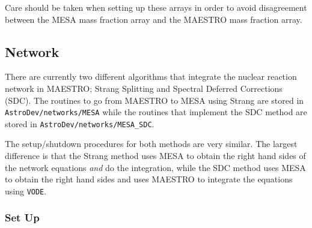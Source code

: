 Care should be taken when setting up these arrays in order to avoid 
disagreement between the {\sf MESA} mass fraction array and the {\sf MAESTRO} 
mass fraction array. 

\subsection{Network}
There are currently two different algorithms that integrate the nuclear 
reaction network in {\sf MAESTRO}; Strang Splitting and Spectral Deferred 
Corrections (SDC). The routines to go from {\sf MAESTRO} 
to {\sf MESA} using Strang are stored in {\tt AstroDev/networks/MESA} while 
the routines that implement the SDC method are stored in 
{\tt AstroDev/networks/MESA\_SDC}.

The setup/shutdown procedures for both methods are very similar. The largest 
difference is that the Strang method uses {\sf MESA} to obtain the right 
hand sides of the network equations \emph{and} do the integration, while the 
SDC method uses {\sf MESA} to obtain the right hand sides and uses 
{\sf MAESTRO} to integrate the equations using {\tt VODE}.

\subsubsection{Set Up}

